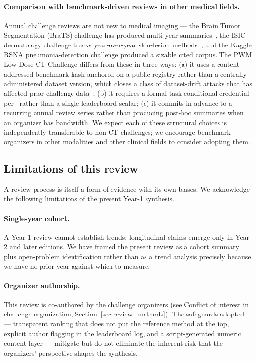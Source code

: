 \documentclass[twoside,11pt]{article}
\begin{document}
\paragraph{Comparison with benchmark-driven reviews in other medical fields.} Annual challenge reviews are not new to medical imaging --- the Brain Tumor Segmentation (BraTS) challenge has produced multi-year summaries~\citep{bakas2019brats}, the ISIC dermatology challenge tracks year-over-year skin-lesion methods~\citep{codella2019isic}, and the Kaggle RSNA pneumonia-detection challenge produced a sizable cited corpus. The PWM Low-Dose CT Challenge differs from these in three ways: (a) it uses a content-addressed benchmark hash anchored on a public registry rather than a centrally-administered dataset version, which closes a class of dataset-drift attacks that has affected prior challenge data~\citep{wang2020deeplearningreview}; (b) it requires a formal task-conditional credential per~\citep{ws2framework} rather than a single leaderboard scalar; (c) it commits in advance to a recurring annual review series rather than producing post-hoc summaries when an organizer has bandwidth. We expect each of these structural choices is independently transferable to non-CT challenges; we encourage benchmark organizers in other modalities and other clinical fields to consider adopting them.

\subsection*{Limitations of this review}

A review process is itself a form of evidence with its own biases. We acknowledge the following limitations of the present Year-1 synthesis.

\paragraph{Single-year cohort.} A Year-1 review cannot establish trends; longitudinal claims emerge only in Year-2 and later editions. We have framed the present review as a cohort summary plus open-problem identification rather than as a trend analysis precisely because we have no prior year against which to measure.

\paragraph{Organizer authorship.} This review is co-authored by the challenge organizers (see Conflict of interest in challenge organization, Section~\ref{sec:review_methods}). The safeguards adopted --- transparent ranking that does not put the reference method at the top, explicit author flagging in the leaderboard log, and a script-generated numeric content layer --- mitigate but do not eliminate the inherent risk that the organizers' perspective shapes the synthesis.
\end{document}
